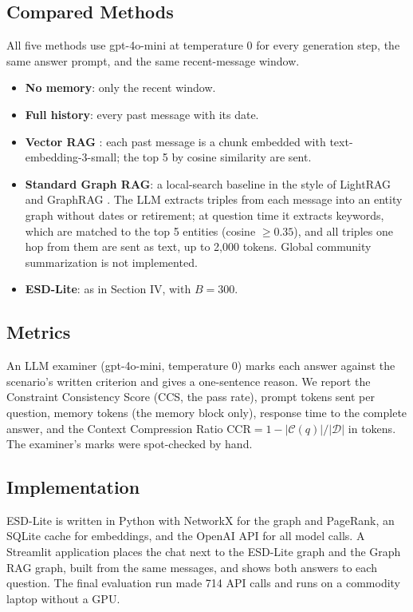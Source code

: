 \documentclass[conference]{IEEEtran}
\begin{document}
\subsection{Compared Methods}
All five methods use gpt-4o-mini at temperature 0 for every generation step, the same answer prompt, and the same recent-message window.
\begin{itemize}
\item \textbf{No memory}: only the recent window.
\item \textbf{Full history}: every past message with its date.
\item \textbf{Vector RAG} \cite{b_rag}: each past message is a chunk embedded with text-embedding-3-small; the top 5 by cosine similarity are sent.
\item \textbf{Standard Graph RAG}: a local-search baseline in the style of LightRAG and GraphRAG \cite{b_lightrag,b_graphrag}. The LLM extracts triples from each message into an entity graph without dates or retirement; at question time it extracts keywords, which are matched to the top 5 entities (cosine $\ge 0.35$), and all triples one hop from them are sent as text, up to 2{,}000 tokens. Global community summarization is not implemented.
\item \textbf{ESD-Lite}: as in Section IV, with $B = 300$.
\end{itemize}

\subsection{Metrics}
An LLM examiner (gpt-4o-mini, temperature 0) \cite{b_judge} marks each answer against the scenario's written criterion and gives a one-sentence reason. We report the Constraint Consistency Score (CCS, the pass rate), prompt tokens sent per question, memory tokens (the memory block only), response time to the complete answer, and the Context Compression Ratio $\text{CCR} = 1 - |\mathcal{C}(q)| / |\mathcal{D}|$ in tokens. The examiner's marks were spot-checked by hand.

\subsection{Implementation}
ESD-Lite is written in Python with NetworkX for the graph and PageRank, an SQLite cache for embeddings, and the OpenAI API for all model calls. A Streamlit application places the chat next to the ESD-Lite graph and the Graph RAG graph, built from the same messages, and shows both answers to each question. The final evaluation run made 714 API calls and runs on a commodity laptop without a GPU.
\end{document}
